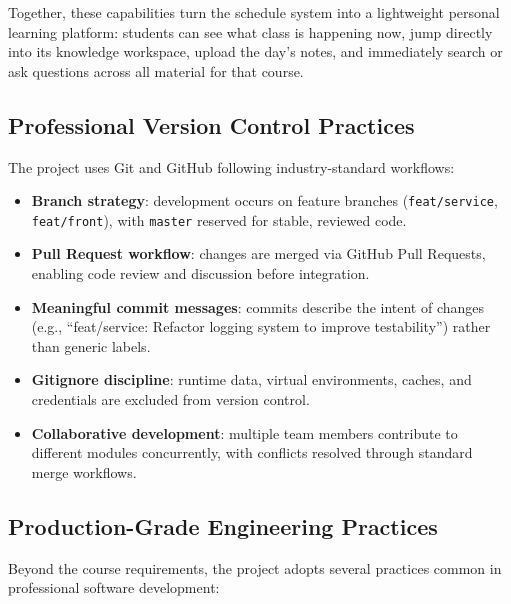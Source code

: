 \documentclass[12pt,a4paper]{article}
\begin{document}
Together, these capabilities turn the schedule system into a lightweight personal learning platform: students can see what class is happening now, jump directly into its knowledge workspace, upload the day's notes, and immediately search or ask questions across all material for that course.

\subsection{Professional Version Control Practices}

The project uses Git and GitHub following industry-standard workflows:

\begin{itemize}[nosep]
    \item \textbf{Branch strategy}: development occurs on feature branches (\texttt{feat/service}, \texttt{feat/front}), with \texttt{master} reserved for stable, reviewed code.
    \item \textbf{Pull Request workflow}: changes are merged via GitHub Pull Requests, enabling code review and discussion before integration.
    \item \textbf{Meaningful commit messages}: commits describe the intent of changes (e.g., ``feat/service: Refactor logging system to improve testability'') rather than generic labels.
    \item \textbf{Gitignore discipline}: runtime data, virtual environments, caches, and credentials are excluded from version control.
    \item \textbf{Collaborative development}: multiple team members contribute to different modules concurrently, with conflicts resolved through standard merge workflows.
\end{itemize}

\subsection{Production-Grade Engineering Practices}

Beyond the course requirements, the project adopts several practices common in professional software development:
\end{document}
